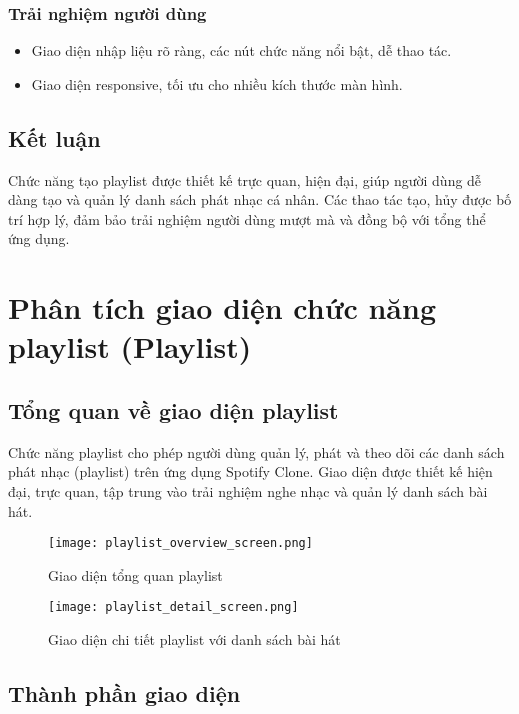 \documentclass{book}
\let\oldsection\section
\renewcommand{\section}{\clearpage\oldsection}
\begin{document}
\subsubsection{Trải nghiệm người dùng}
\begin{itemize}
    \item Giao diện nhập liệu rõ ràng, các nút chức năng nổi bật, dễ thao tác.
    \item Giao diện responsive, tối ưu cho nhiều kích thước màn hình.
\end{itemize}

\subsection{Kết luận}
Chức năng tạo playlist được thiết kế trực quan, hiện đại, giúp người dùng dễ dàng tạo và quản lý danh sách phát nhạc cá nhân. Các thao tác tạo, hủy được bố trí hợp lý, đảm bảo trải nghiệm người dùng mượt mà và đồng bộ với tổng thể ứng dụng.

\section{Phân tích giao diện chức năng playlist (Playlist)}

\subsection{Tổng quan về giao diện playlist}
Chức năng playlist cho phép người dùng quản lý, phát và theo dõi các danh sách phát nhạc (playlist) trên ứng dụng Spotify Clone. Giao diện được thiết kế hiện đại, trực quan, tập trung vào trải nghiệm nghe nhạc và quản lý danh sách bài hát.

\begin{figure}[h!]
\centering
\texttt{[image: playlist\_overview\_screen.png]} %
\caption{Giao diện tổng quan playlist}
\label{fig:playlist_overview}
\end{figure}

\begin{figure}[h!]
\centering
\texttt{[image: playlist\_detail\_screen.png]} %
\caption{Giao diện chi tiết playlist với danh sách bài hát}
\label{fig:playlist_detail}
\end{figure}

\subsection{Thành phần giao diện}
\end{document}
